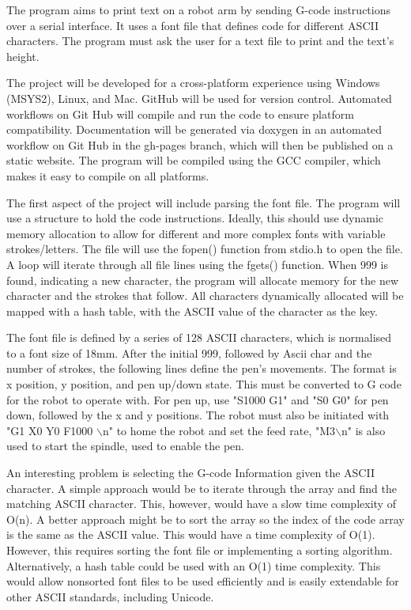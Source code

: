 The program aims to print text on a robot arm by sending G-code instructions over a serial interface. It uses a font file that defines code for different ASCII characters. The program must ask the user for a text file to print and the text's height.

The project will be developed for a cross-platform experience using Windows (MSYS2), Linux, and Mac. GitHub will be used for version control. Automated workflows on Git Hub will compile and run the code to ensure platform compatibility. Documentation will be generated via doxygen in an automated workflow on Git Hub in the gh-pages branch, which will then be published on a static website. The program will be compiled using the GCC compiler, which makes it easy to compile on all platforms. 

The first aspect of the project will include parsing the font file. The program will use a structure to hold the code instructions. Ideally, this should use dynamic memory allocation to allow for different and more complex fonts with variable strokes/letters. The file will use the fopen() function from stdio.h to open the file. A loop will iterate through all file lines using the fgets() function. When 999 is found, indicating a new character, the program will allocate memory for the new character and the strokes that follow. All characters dynamically allocated will be mapped with a hash table, with the ASCII value of the character as the key.

The font file is defined by a series of 128 ASCII characters, which is normalised to a font size of 18mm. After the initial 999, followed by Ascii char and the number of strokes, the following lines define the pen's movements. The format is x position, y position, and pen up/down state. This must be converted to G code for the robot to operate with. For pen up, use "S1000 G1" and "S0 G0" for pen down, followed by the x and y positions. The robot must also be initiated with "G1 X0 Y0 F1000 $\backslash$n" to home the robot and set the feed rate, "M3$\backslash$n" is also used to start the spindle, used to enable the pen.

An interesting problem is selecting the G-code Information given the ASCII character. A simple approach would be to iterate through the array and find the matching ASCII character. This, however, would have a slow time complexity of O(n). A better approach might be to sort the array so the index of the code array is the same as the ASCII value. This would have a time complexity of O(1). However, this requires sorting the font file or implementing a sorting algorithm. Alternatively, a hash table could be used with an O(1) time complexity. This would allow nonsorted font files to be used efficiently and is easily extendable for other ASCII standards, including Unicode. 

